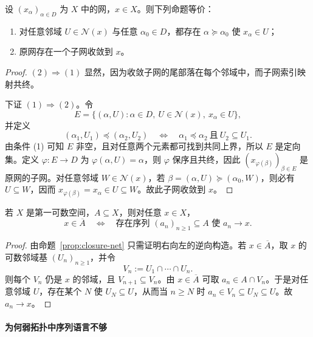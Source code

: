 \begin{proposition}[聚点与子网]\label{prop:cluster-subnet}
设 $(x_\alpha)_{\alpha\in D}$ 为 $X$ 中的网，$x\in X$。则下列命题等价：
\begin{enumerate}
  \item 对任意邻域 $U\in\mathcal N(x)$ 与任意 $\alpha_0\in D$，都存在 $\alpha\succeq\alpha_0$ 使 $x_\alpha\in U$；
  \item 原网存在一个子网收敛到 $x$。
\end{enumerate}
\end{proposition}

\begin{proof}
$(2)\Rightarrow(1)$ 显然，因为收敛子网的尾部落在每个邻域中，而子网索引映射共终。

下证 $(1)\Rightarrow(2)$。令
\[
E=\{(\alpha,U):\alpha\in D,\ U\in\mathcal N(x),\ x_\alpha\in U\},
\]
并定义
\[
(\alpha_1,U_1)\preceq(\alpha_2,U_2)
\quad\Longleftrightarrow\quad
\alpha_1\preceq \alpha_2\ \text{且}\ U_2\subseteq U_1.
\]
由条件 (1) 可知 $E$ 非空，且对任意两个元素都可找到共同上界，所以 $E$ 是定向集。定义 $\varphi\colon E\to D$ 为 $\varphi(\alpha,U)=\alpha$，则 $\varphi$ 保序且共终，因此 $(x_{\varphi(\beta)})_{\beta\in E}$ 是原网的子网。对任意邻域 $W\in\mathcal N(x)$，若 $\beta=(\alpha,U)\succeq(\alpha_0,W)$，则必有 $U\subseteq W$，因而 $x_{\varphi(\beta)}=x_\alpha\in U\subseteq W$。故此子网收敛到 $x$。
\end{proof}

\begin{proposition}[第一可数空间中序列已足够]\label{prop:first-countable-sequence}
若 $X$ 是第一可数空间，$A\subseteq X$，则对任意 $x\in X$，
\[
x\in \overline{A}
\quad\Longleftrightarrow\quad
\text{存在序列 }(a_n)_{n\ge1}\subseteq A\text{ 使 }a_n\to x.
\]
\end{proposition}

\begin{proof}
由命题~\ref{prop:closure-net} 只需证明右向左的逆向构造。若 $x\in\overline{A}$，取 $x$ 的可数邻域基 $(U_n)_{n\ge1}$，并令
\[
V_n:=U_1\cap\cdots\cap U_n.
\]
则每个 $V_n$ 仍是 $x$ 的邻域，且 $V_{n+1}\subseteq V_n$。由 $x\in\overline{A}$ 可取 $a_n\in A\cap V_n$。于是对任意邻域 $U$，存在某个 $N$ 使 $U_N\subseteq U$，从而当 $n\ge N$ 时 $a_n\in V_n\subseteq U_N\subseteq U$。故 $a_n\to x$。
\end{proof}

\paragraph{为何弱拓扑中序列语言不够}

